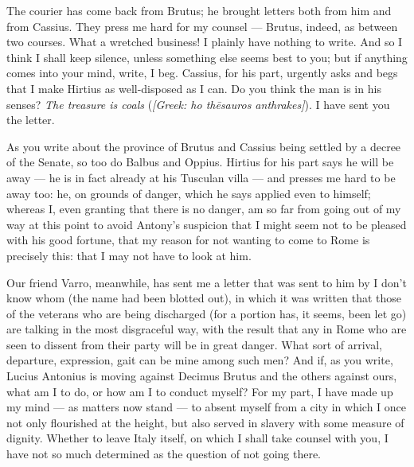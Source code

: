 

 The courier has come back from Brutus; he brought letters both from him and from Cassius. They press me hard for my counsel --- Brutus, indeed, as between two courses. What a wretched business! I plainly have nothing to write. And so I think I shall keep silence, unless something else seems best to you; but if anything comes into your mind, write, I beg. Cassius, for his part, urgently asks and begs that I make Hirtius as well-disposed as I can. Do you think the man is in his senses? \textit{The treasure is coals} (\textit{[Greek: ho th\=esauros anthrakes]}). I have sent you the letter.

 As you write about the province of Brutus and Cassius being settled by a decree of the Senate, so too do Balbus and Oppius. Hirtius for his part says he will be away --- he is in fact already at his Tusculan villa --- and presses me hard to be away too: he, on grounds of danger, which he says applied even to himself; whereas I, even granting that there is no danger, am so far from going out of my way at this point to avoid Antony's suspicion that I might seem not to be pleased with his good fortune, that my reason for not wanting to come to Rome is precisely this: that I may not have to look at him.

 Our friend Varro, meanwhile, has sent me a letter that was sent to him by I don't know whom (the name had been blotted out), in which it was written that those of the veterans who are being discharged (for a portion has, it seems, been let go) are talking in the most disgraceful way, with the result that any in Rome who are seen to dissent from their party will be in great danger. What sort of arrival, departure, expression, gait can be mine among such men? And if, as you write, Lucius Antonius is moving against Decimus Brutus and the others against ours, what am I to do, or how am I to conduct myself? For my part, I have made up my mind --- as matters now stand --- to absent myself from a city in which I once not only flourished at the height, but also served in slavery with some measure of dignity. Whether to leave Italy itself, on which I shall take counsel with you, I have not so much determined as the question of not going there.
